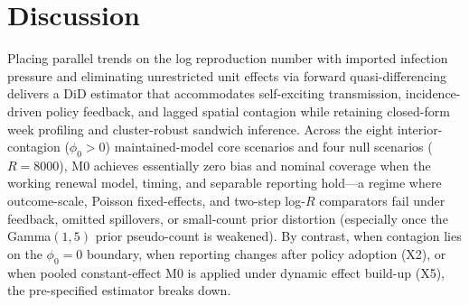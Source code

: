 \section{Discussion}
\label{s:discussion}

Placing parallel trends on the log reproduction number with imported infection pressure and
eliminating unrestricted unit effects via forward quasi-differencing delivers a DiD estimator that
accommodates self-exciting transmission, incidence-driven policy feedback, and lagged spatial
contagion while retaining closed-form week profiling and cluster-robust sandwich inference. Across
the eight interior-contagion ($\phi_0>0$) maintained-model core scenarios and four null scenarios
($R=8000$), M0 achieves essentially zero bias and nominal coverage when the working renewal model,
timing, and separable reporting hold---a regime where outcome-scale, Poisson fixed-effects, and
two-step log-$R$ comparators fail under feedback, omitted spillovers, or small-count prior
distortion (especially once the Gamma$(1,5)$ prior pseudo-count is weakened). By contrast, when
contagion lies on the $\phi_0=0$ boundary, when reporting changes after policy adoption (X2), or
when pooled constant-effect M0 is applied under dynamic effect build-up (X5), the pre-specified
estimator breaks down.


